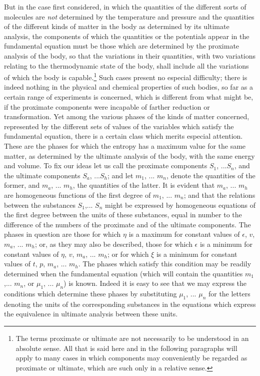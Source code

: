 \documentclass[12pt]{article}
\begin{document}
But in the case first considered, in which the quantities of the different sorts of molecules are \textit{not} determined by the temperature and pressure and the quantities of the different kinds of matter in the body as determined by its ultimate analysis, the components of which the quantities or the potentials appear in the fundamental equation must be those which are determined by the proximate analysis of the body, so that the variations in their quantities, with two variations relating to the thermodynamic state of the body, shall include all the variations of which the body is capable.\footnote{The terms proximate or ultimate are not necessarily to be understood in an absolute sense. All that is said here and in the following paragraphs will apply to many cases in which components may conveniently be regarded as proximate or ultimate, which are such only in a relative sense.} Such cases present no especial difficulty; there is indeed nothing in the physical and chemical properties of such bodies, so far as a certain range of experiments is concerned, which is different from what might be, if the proximate components were incapable of farther reduction or transformation. Yet among the various phases of the kinds of matter concerned, represented by the different sets of values of the variables which satisfy the fundamental equation, there is a certain class which merits especial attention. These are the phases for which the entropy has a maximum value for the same matter, as determined by the ultimate analysis of the body, with the same energy and volume. To fix our ideas let us call the proximate components $S_1$, ...$S_n$, and the ultimate components $S_a$, ...$S_h$; and let $m_1$, ... $m_n$, denote the quantities of the former, and $m_a$, ... $m_h$, the quantities of the latter. It is evident that $m_a$, ... $m_h$ are homogeneous functions of the first degree of $m_1$, ... $m_n$; and that the relations between the substances $S_1$,... $S_n$ might be expressed by homogeneous equations of the first degree between the units of these substances, equal in number to the difference of the numbers of the proximate and of the ultimate components. The phases in question are those for which $\eta$ is a maximum for constant values of $\epsilon$, $v$, $m
_a$, ... $m_h$; or, as they may also be described, those for which $\epsilon$ is a minimum for constant values of $\eta$, $v$, $m_a$, ... $m_h$; or for which $\xi$ is a minimum  for constant values of $t$, $p$, $m_a$, ... $m_h$. The phases which satisfy this condition may be readily determined when the fundamental equation (which will contain the quantities $m_1$,... $m_n$, or $\mu_1$, ... $\mu_n$) is known. Indeed it is easy to see that we may express the conditions which determine these phases by substituting  $\mu_1$, ... $\mu_n$ for the letters denoting the units of the corresponding substances in the equations which express the equivalence in ultimate analysis between these units.
\end{document}
